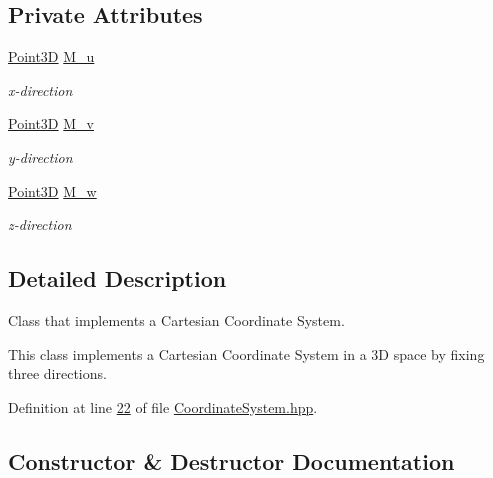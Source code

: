 \subsection*{Private Attributes}
\begin{DoxyCompactItemize}
\item 
\hyperlink{classFVCode3D_1_1Point3D}{Point3D} \hyperlink{classFVCode3D_1_1CoordinateSystem3D_a29111cacf2f4162819d01c75d79fd0b5}{M\+\_\+u}
\begin{DoxyCompactList}\small\item\em x-\/direction \end{DoxyCompactList}\item 
\hyperlink{classFVCode3D_1_1Point3D}{Point3D} \hyperlink{classFVCode3D_1_1CoordinateSystem3D_a9633fb461a4e62882f855d2aa372fe1a}{M\+\_\+v}
\begin{DoxyCompactList}\small\item\em y-\/direction \end{DoxyCompactList}\item 
\hyperlink{classFVCode3D_1_1Point3D}{Point3D} \hyperlink{classFVCode3D_1_1CoordinateSystem3D_a2633d282f332c2129d339bec4cd53c3f}{M\+\_\+w}
\begin{DoxyCompactList}\small\item\em z-\/direction \end{DoxyCompactList}\end{DoxyCompactItemize}


\subsection{Detailed Description}
Class that implements a Cartesian Coordinate System. 

This class implements a Cartesian Coordinate System in a 3D space by fixing three directions. 

Definition at line \hyperlink{CoordinateSystem_8hpp_source_l00022}{22} of file \hyperlink{CoordinateSystem_8hpp_source}{Coordinate\+System.\+hpp}.



\subsection{Constructor \& Destructor Documentation}
